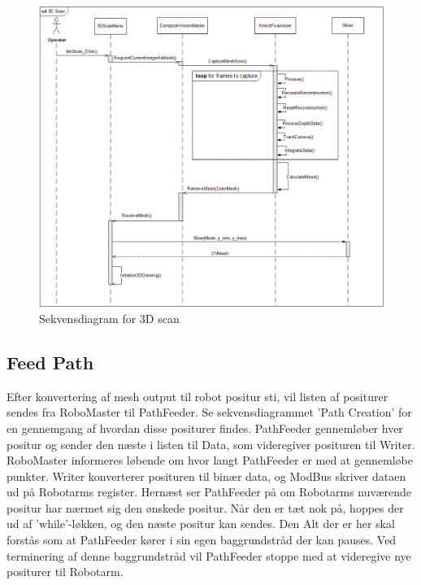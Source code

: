 \begin{figure}[H]
    \centering
    \includegraphics[width=1\textwidth]{figurer/d/Design/Sequence/sd_3Dscan}
    \caption{Sekvensdiagram for 3D scan}
    \label{sd_3Dscan}
\end{figure}
\newpage

\subsection{Feed Path}
Efter konvertering af mesh output til robot positur sti, vil listen af positurer sendes fra RoboMaster til PathFeeder. 
Se sekvensdiagrammet 'Path Creation' for en gennemgang af hvordan disse positurer findes.
PathFeeder gennemløber hver positur og sender den næste i listen til Data, som videregiver posituren til Writer.
RoboMaster informeres løbende om hvor langt PathFeeder er med at gennemløbe punkter.
Writer konverterer posituren til binær data, og ModBus skriver dataen ud på Robotarms register.
Hernæst ser PathFeeder på om Robotarms nuværende positur har nærmet sig den ønskede positur. 
Når den er tæt nok på, hoppes der ud af 'while'-løkken, og den næste positur kan sendes.
Den Alt der er her skal forstås som at PathFeeder kører i sin egen baggrundstråd der kan pauses. 
Ved terminering af denne baggrundstråd vil PathFeeder stoppe med at videregive nye positurer til Robotarm.


